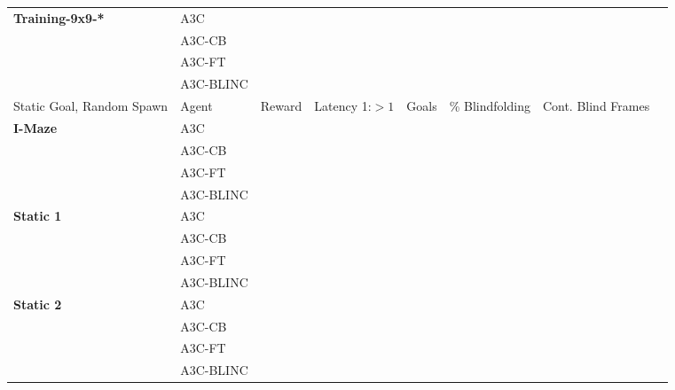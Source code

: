 \begin{table}[h]
\begin{center}
{\begin{tabular}{llllllll}
            \midrule
            \textbf{Training-9x9-*} &A3C &  &  &  \\
                              &A3C-CB &  &  &  \\
                              &A3C-FT &  &  &  \\
                              &A3C-BLINC &  &  &  \\
          \toprule
            Static Goal, Random Spawn & Agent & Reward & Latency 1:$>1$ & Goals & \% Blindfolding & Cont. Blind Frames \\
          \midrule
            \textbf{I-Maze} &A3C &  &  &  \\
                              &A3C-CB &  &  &  \\
                              &A3C-FT &  &  &  \\
                              &A3C-BLINC &  &  &  \\
          \midrule
            \textbf{Static 1} &A3C &  &  &  \\
                              &A3C-CB &  &  &  \\
                              &A3C-FT &  &  &  \\
                              &A3C-BLINC &  &  &  \\
          \midrule
            \textbf{Static 2} &A3C &  &  &  \\
                              &A3C-CB &  &  &  \\
                              &A3C-FT &  &  &  \\
                              &A3C-BLINC &  &  &  \\
          

\end{tabular}}
\end{center}
\end{table}
